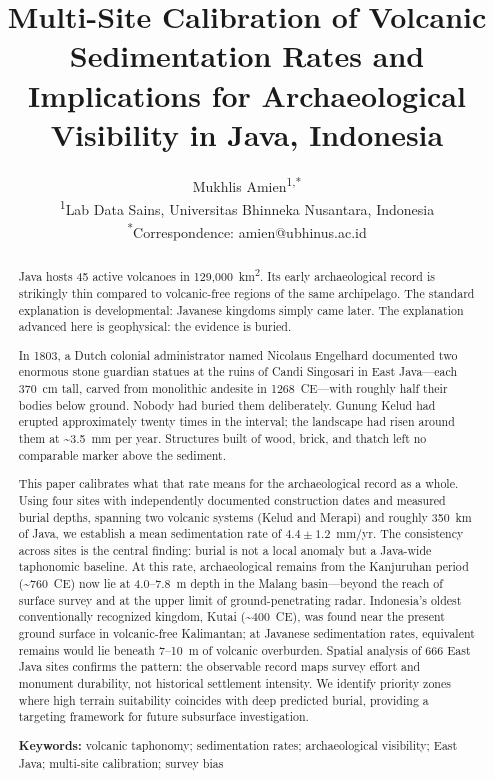 \documentclass[12pt,a4paper]{article}
\title{Multi-Site Calibration of Volcanic Sedimentation Rates and Implications for Archaeological Visibility in Java, Indonesia}
\author{
  Mukhlis Amien\textsuperscript{1,*}\\[6pt]
  \small \textsuperscript{1}Lab Data Sains, Universitas Bhinneka Nusantara, Indonesia\\
  \small \textsuperscript{*}Correspondence: amien@ubhinus.ac.id
}
\date{}
\begin{document}
\maketitle

\begin{abstract}
Java hosts 45 active volcanoes in 129,000~km\textsuperscript{2}. Its early archaeological record is strikingly thin compared to volcanic-free regions of the same archipelago. The standard explanation is developmental: Javanese kingdoms simply came later. The explanation advanced here is geophysical: the evidence is buried.

In 1803, a Dutch colonial administrator named Nicolaus Engelhard documented two enormous stone guardian statues at the ruins of Candi Singosari in East Java---each 370~cm tall, carved from monolithic andesite in 1268~CE---with roughly half their bodies below ground. Nobody had buried them deliberately. Gunung Kelud had erupted approximately twenty times in the interval; the landscape had risen around them at \textasciitilde3.5~mm per year. Structures built of wood, brick, and thatch left no comparable marker above the sediment.

This paper calibrates what that rate means for the archaeological record as a whole. Using four sites with independently documented construction dates and measured burial depths, spanning two volcanic systems (Kelud and Merapi) and roughly 350~km of Java, we establish a mean sedimentation rate of $4.4 \pm 1.2$~mm/yr. The consistency across sites is the central finding: burial is not a local anomaly but a Java-wide taphonomic baseline. At this rate, archaeological remains from the Kanjuruhan period (\textasciitilde760~CE) now lie at 4.0--7.8~m depth in the Malang basin---beyond the reach of surface survey and at the upper limit of ground-penetrating radar. Indonesia's oldest conventionally recognized kingdom, Kutai (\textasciitilde400~CE), was found near the present ground surface in volcanic-free Kalimantan; at Javanese sedimentation rates, equivalent remains would lie beneath 7--10~m of volcanic overburden. Spatial analysis of 666 East Java sites confirms the pattern: the observable record maps survey effort and monument durability, not historical settlement intensity. We identify priority zones where high terrain suitability coincides with deep predicted burial, providing a targeting framework for future subsurface investigation.

\medskip
\noindent\textbf{Keywords:} volcanic taphonomy; sedimentation rates; archaeological visibility; East Java; multi-site calibration; survey bias
\end{abstract}
\end{document}
